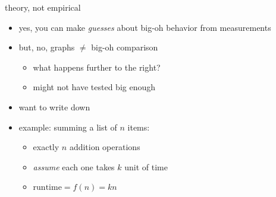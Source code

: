 \begin{frame}{theory, not empirical}
    \begin{itemize}
    \item yes, you can make \textit{guesses} about big-oh behavior from measurements
    \item but, no, graphs $\not=$ big-oh comparison
    \begin{itemize}
        \item what happens further to the right?
        \item might not have tested big enough
    \end{itemize}
    \vspace{.5cm}
    \item want to write down 
    \item<2-> example: summing a list of $n$ items:
        \begin{itemize}
        \item exactly $n$ addition operations
        \item \textit{assume} each one takes $k$ unit of time
        \item $\text{runtime} = f(n) = kn$
        \end{itemize}
    \end{itemize}
\end{frame}
